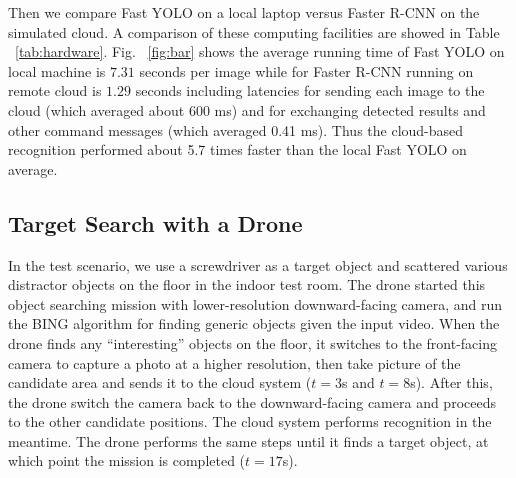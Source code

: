 Then we compare Fast YOLO on a local laptop versus Faster R-CNN on the simulated cloud. 
A comparison of these computing facilities are showed in Table ~\ref{tab:hardware}. 
Fig. ~\ref{fig:bar} shows the average running time of Fast YOLO on local machine is $7.31$ seconds per image while for Faster R-CNN running on remote cloud is $1.29$ seconds including latencies for sending each image to the cloud (which averaged about 600 ms) and for exchanging detected results and other command messages (which averaged 0.41 ms). Thus the cloud-based recognition performed about 5.7 times faster than the local Fast YOLO on average.

\subsection{Target Search with a Drone}
In the test scenario, we use a screwdriver as a target object and scattered various distractor objects on the floor in the indoor test room. 
The drone started this object searching mission with lower-resolution downward-facing camera, and run the BING algorithm for finding generic objects given the input video.
When the drone finds any ``interesting'' objects on the floor, it switches to the front-facing camera to capture a photo at a higher resolution, then take picture of the candidate area and sends it to the cloud system ($t=3$s and $t=8$s).
After this, the drone switch the camera back to the downward-facing camera and proceeds to the other candidate positions. 
The cloud system performs recognition in the meantime.
The drone performs the same steps until it finds a target object, at which point the mission is completed ($t=17$s).

